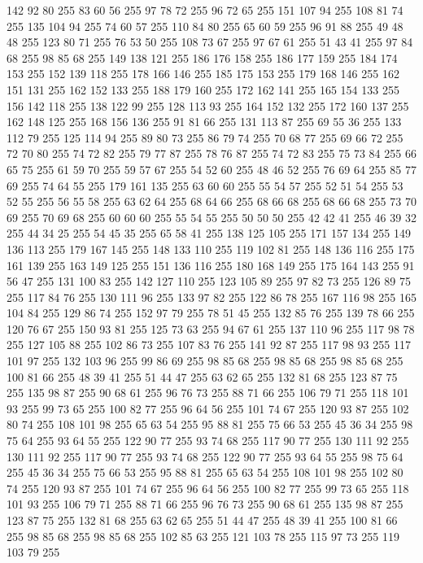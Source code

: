142 92 80 255 83 60 56 255 97 78 72 255 96 72 65 255 151 107 94 255 108 81 74 255 135 104 94 255 74 60 57 255 110 84 80 255 65 60 59 255 96 91 88 255 49 48 48 255 123 80 71 255 76 53 50 255 108 73 67 255 97 67 61 255 51 43 41 255 97 84 68 255 98 85 68 255 149 138 121 255 186 176 158 255 186 177 159 255 184 174 153 255 152 139 118 255 178 166 146 255 185 175 153 255 179 168 146 255 162 151 131 255 162 152 133 255 188 179 160 255 172 162 141 255 165 154 133 255 156 142 118 255 138 122 99 255 128 113 93 255 164 152 132 255 172 160 137 255 162 148 125 255 168 156 136 255 91 81 66 255 131 113 87 255 69 55 36 255 133 112 79 255 125 114 94 255 89 80 73 255 86 79 74 255 70 68 77 255 69 66 72 255 72 70 80 255 74 72 82 255 79 77 87 255 78 76 87 255 74 72 83 255 75 73 84 255 66 65 75 255 61 59 70 255 59 57 67 255 54 52 60 255 48 46 52 255 76 69 64 255 85 77 69 255 74 64 55 255 179 161 135 255 63 60 60 255
55 54 57 255 52 51 54 255 53 52 55 255 56 55 58 255 63 62 64 255 68 64 66 255 68 66 68 255 68 66 68 255 73 70 69 255 70 69 68 255 60 60 60 255 55 54 55 255 50 50 50 255 42 42 41 255 46 39 32 255 44 34 25 255 54 45 35 255 65 58 41 255 138 125 105 255 171 157 134 255 149 136 113 255 179 167 145 255 148 133 110 255 119 102 81 255 148 136 116 255 175 161 139 255 163 149 125 255 151 136 116 255 180 168 149 255 175 164 143 255 91 56 47 255 131 100 83 255 142 127 110 255 123 105 89 255 97 82 73 255 126 89 75 255 117 84 76 255 130 111 96 255 133 97 82 255 122 86 78 255 167 116 98 255 165 104 84 255 129 86 74 255 152 97 79 255 78 51 45 255 132 85 76 255 139 78 66 255 120 76 67 255 150 93 81 255 125 73 63 255 94 67 61 255 137 110 96 255 117 98 78 255 127 105 88 255 102 86 73 255 107 83 76 255 141 92 87 255 117 98 93 255 117 101 97 255 132 103 96 255 99 86 69 255 98 85 68 255 98 85 68 255 98 85 68 255
100 81 66 255 48 39 41 255 51 44 47 255 63 62 65 255 132 81 68 255 123 87 75 255 135 98 87 255 90 68 61 255 96 76 73 255 88 71 66 255 106 79 71 255 118 101 93 255 99 73 65 255 100 82 77 255 96 64 56 255 101 74 67 255 120 93 87 255 102 80 74 255 108 101 98 255 65 63 54 255 95 88 81 255 75 66 53 255 45 36 34 255 98 75 64 255 93 64 55 255 122 90 77 255 93 74 68 255 117 90 77 255 130 111 92 255 130 111 92 255 117 90 77 255 93 74 68 255 122 90 77 255 93 64 55 255 98 75 64 255 45 36 34 255 75 66 53 255 95 88 81 255 65 63 54 255 108 101 98 255 102 80 74 255 120 93 87 255 101 74 67 255 96 64 56 255 100 82 77 255 99 73 65 255 118 101 93 255 106 79 71 255 88 71 66 255 96 76 73 255 90 68 61 255 135 98 87 255 123 87 75 255 132 81 68 255 63 62 65 255 51 44 47 255 48 39 41 255 100 81 66 255 98 85 68 255 98 85 68 255 102 85 63 255 121 103 78 255 115 97 73 255 119 103 79 255
